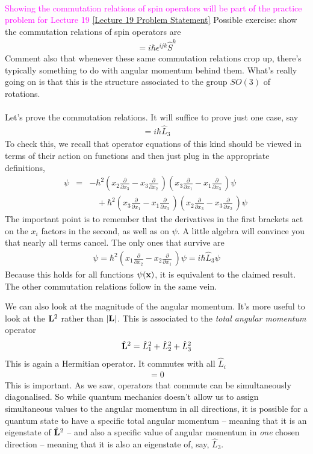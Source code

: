 \documentclass[12pt]{article}
\def\be{\begin{eqnarray}}
\def\ee{\end{eqnarray}}
\newcommand{\nn}{\nonumber}
\newcommand\para{\paragraph{}}
\newcommand{\ppp}[2]{\frac{\partial {#1}}{\partial {#2}}}
\newcommand{\co}{\color{olive}}
\newcommand{\cblue}{\color{blue}}
\newcommand{\bx}{{\bf x}}
\newcommand{\alyssa}{\textcolor{magenta}}
\begin{document}
{\para
\alyssa{Showing the commutation relations of spin operators will be part of the practice problem for Lecture 19} \href{https://drive.google.com/file/d/1rzUg-9TFLG4pKcETaEh5WDlRMdxFGVMX/view?usp=drive_link}{[Lecture 19 Problem Statement]}
{\cblue Possible exercise: show the commutation relations of spin operators are
%
\be [\hat{S}^i,\hat{S}^j] = i\hbar \epsilon^{ijk}\hat{S}^k \nn\ee
%
Comment also that whenever these same commutation relations crop up, there's typically something to do with angular momentum behind them. What's really going on is that this is the structure associated to the group $SO(3)$ of rotations.}





\para
{\co Let's prove the commutation relations. It will suffice to prove just one case, say
%
\be [\hat{L}_1,\hat{L}_2] = i\hbar \hat{L}_3\nn\ee
%
To check this, we recall that operator equations of this kind should be viewed in terms of their action on functions and then just plug in the appropriate definitions,
%
\be [\hat{L}_1,\hat{L}_2]\psi &=& -\hbar^2\left(x_2\ppp{}{x_3} -x_3\ppp{}{x_2}\,\right)\left(x_3\ppp{}{x_1} -x_1\ppp{}{x_3}\,\right) \psi \nn\\ &&\ \ \ \  +\hbar^2 \left(x_3\ppp{}{x_1} -x_1\ppp{}{x_3}\,\right)  \left(x_2\ppp{}{x_3} -x_3\ppp{}{x_2}\,\right)  \psi \ \nn\ee
%
The important point is to remember that the derivatives in the first brackets act on the $x_i$ factors in the second, as well as on $\psi$. 
A little algebra will convince you that nearly all terms cancel. The only ones that survive are
%
\be [\hat{L}_1,\hat{L}_2]\psi = \hbar^2\left(x_1\ppp{}{x_2} -x_2\ppp{}{x_1}\,\right)\psi =i\hbar\hat{L}_3\psi\nn\ee
%
Because this holds for all  functions $\psi(\bx)$, it is equivalent to the claimed result.} The other commutation relations  follow in the same vein.



{\co We can also look at the magnitude of the  angular momentum. It's more useful to look at the ${\bf L}^2$ rather than $|{\bf L}|$. This is associated to the {\it total angular momentum} operator
%
\be \hat{\bf L}^2 = \hat{L}_1^2 +\hat{L}_2^2 + \hat{L}_3^2  \nn\ee
%
This is again a Hermitian operator. It commutes with all $\hat{L}_i$
%
\be [\hat{\bf L}^2,\hat{L}_i] = 0\nn\ee
%
} This is important. As we saw,  operators that commute can be simultaneously diagonalised. So while quantum mechanics
doesn't allow us to assign simultaneous values to the angular momentum in all directions, it is possible for a  quantum state to have a specific total angular momentum -- meaning that it is an eigenstate of $\hat{\bf L}^2$ -- and also a specific value of angular momentum in {\it one} chosen direction -- meaning that it is also an eigenstate of, say, $\hat{L}_3$.

}
\end{document}
